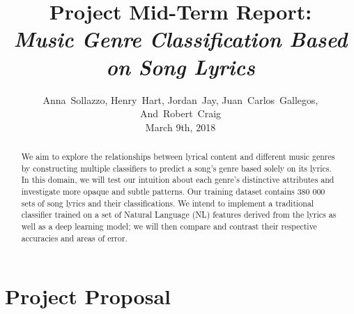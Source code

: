 \documentclass[journal]{IEEEtran}
\begin{document}
\title{Project Mid-Term Report:\\\emph{Music Genre Classification Based on Song Lyrics}}

\author{Anna~Sollazzo,
        Henry~Hart,
        Jordan~Jay,
        Juan~Carlos~Gallegos,
        And~Robert~Craig \\ March 9th, 2018}

\maketitle


\begin{abstract}

    We aim to explore the relationships between lyrical content and different music genres by constructing multiple classifiers to predict a song's genre based solely on its lyrics. In this domain, we will test our intuition about each genre's distinctive attributes and investigate more opaque and subtle patterns. Our training dataset contains 380 000 sets of song lyrics and their classifications. We intend to implement a traditional classifier trained on a set of Natural Language (NL) features derived from the lyrics as well as a deep learning model; we will then compare and contrast their respective accuracies and areas of error.\par

\end{abstract}

\section{Project Proposal}
\end{document}
